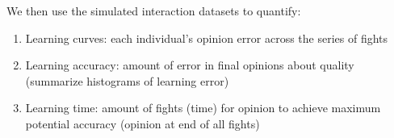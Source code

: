 
We then use the simulated interaction datasets to quantify: 
\begin{enumerate}
  \item Learning curves: each individual's opinion error across the series of fights 
  \item Learning accuracy: amount of error in final opinions about quality (summarize histograms of learning error)
  \item Learning time: amount of fights (time) for opinion to achieve maximum potential accuracy (opinion at end of all fights)  
\end{enumerate}